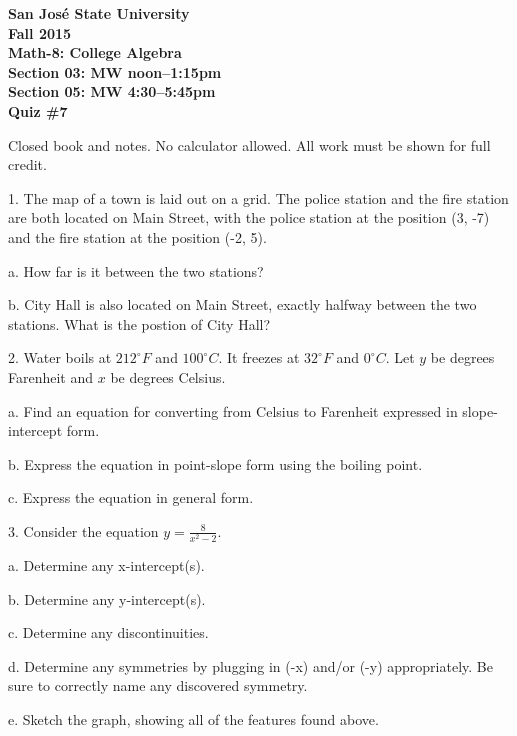 \documentclass[letterpaper, 12pt]{article}
\begin{document}
\begin{center}
\bfseries
San Jos\'{e} State University \\
Fall 2015 \\
Math-8: College Algebra \\
Section 03: MW noon--1:15pm \\
Section 05: MW 4:30--5:45pm \\
\bigskip
Quiz \#7
\end{center}

\bigskip

Closed book and notes. No calculator allowed. All work must be shown for full
credit.

\bigskip

1. The map of a town is laid out on a grid. The police station and the fire
station are both located on Main Street, with the police station at the
position (3, -7) and the fire station at the position (-2, 5).

\bigskip

a. How far is it between the two stations?

\vspace{3in}

b. City Hall is also located on Main Street, exactly halfway between the two
stations. What is the postion of City Hall?

\newpage

2. Water boils at $212^{\circ} F$ and $100^{\circ} C$. It freezes at $32^{\circ}F$
and $0^{\circ}C$. Let $y$ be degrees Farenheit and $x$ be degrees Celsius.

\bigskip

a. Find an equation for converting from Celsius to Farenheit expressed in
slope-intercept form.

\vspace{3in}

b. Express the equation in point-slope form using the boiling point.

\vspace{2in}

c. Express the equation in general form.

\newpage

3. Consider the equation $y=\frac{8}{x^2-2}$.

\bigskip

a. Determine any x-intercept(s).

\vspace{1in}

b. Determine any y-intercept(s).

\vspace{1in}

c. Determine any discontinuities.

\vspace{1in}

d. Determine any symmetries by plugging in (-x) and/or (-y) appropriately. Be
sure to correctly name any discovered symmetry.

\vspace{2in}

e. Sketch the graph, showing all of the features found above.
\end{document}
